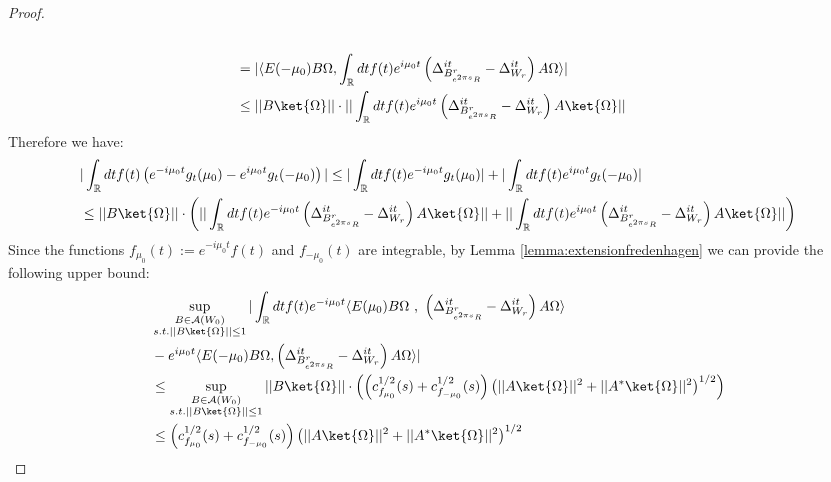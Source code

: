 \documentclass[a4paper,11pt]{article}
\theoremstyle{definition}
\theoremstyle{remark}
\newcommand{\lb}{\left(}
\newcommand{\rb}{\right)}
\begin{document}
\begin{proof}
\begin{align}
\begin{split}
            \\&
            = |\langle E(-\mu_0)B\Omega, \int_\mathbb{R} dt f(t) e^{i\mu_0 t}\lb\Delta^{it}_{B^r_{e^{2\pi s}R}} - \Delta^{it}_{W_r}\rb A \Omega \rangle|
            \\&
            \leq ||B\ket{\Omega}||\cdot||\int_\mathbb{R} dt f(t) e^{i\mu_0 t}\lb \Delta^{it}_{B^r_{e^{2\pi s}R}} - \Delta^{it}_{W_r} \rb A\ket{\Omega}||
        \end{split}
    \end{align}
    Therefore we have:
    \begin{align}
        \begin{split}
            &|\int_\mathbb{R} dt f(t)\lb e^{-i\mu_0 t}g_t(\mu_0) - e^{i\mu_0 t}g_t(-\mu_0) \rb| \leq |\int_\mathbb{R} dt f(t) e^{-i\mu_0 t}g_t(\mu_0)| + |\int_\mathbb{R} dt f(t) e^{i\mu_0 t}g_t(-\mu_0)|
            \\&
            \leq ||B\ket{\Omega}||\cdot \lb||\int_\mathbb{R} dt f(t) e^{-i\mu_0 t}\lb\Delta^{it}_{B^r_{e^{2\pi s}R}} - \Delta^{it}_{W_r}\rb A\ket{\Omega}|| + ||\int_\mathbb{R} dt f(t) e^{i\mu_0 t}\lb\Delta^{it}_{B^r_{e^{2\pi s}R}} - \Delta^{it}_{W_r}\rb A\ket{\Omega}||\rb
        \end{split}
    \end{align}
    Since the functions $f_{\mu_0}(t) := e^{-i\mu_0 t}f(t)$ and $f_{-\mu_0}(t)$ are integrable, by Lemma \ref{lemma:extensionfredenhagen} we can provide the following upper bound:
    \begin{align}
        \begin{split}
            &\sup_{\substack{B\in\mathcal{A}(W_0)\\s.t.||B\ket{\Omega}||\leq 1}}|\int_\mathbb{R} dt f(t) e^{-i\mu_0 t}\langle E(\mu_0)B\Omega\text{ , }\lb\Delta^{it}_{B^r_{e^{2\pi s}R}} - \Delta^{it}_{W_r}\rb A\Omega\rangle \\& - e^{i\mu_0 t}\langle E(-\mu_0)B\Omega, \lb\Delta^{it}_{B^r_{e^{2\pi s}R}} - \Delta^{it}_{W_r}\rb A\Omega\rangle|
            \\&
            \leq \sup_{\substack{B\in\mathcal{A}(W_0)\\s.t.||B\ket{\Omega}||\leq 1}}||B\ket{\Omega}||\cdot\lb \lb c_{f_{\mu_0}}^{1/2}(s) + c_{f_{-\mu_0}}^{1/2}(s)\rb\lb||A\ket{\Omega}||^2 + ||A^*\ket{\Omega}||^2\rb^{1/2}\rb
            \\&
            \leq \lb c_{f_{\mu_0}}^{1/2}(s) + c_{f_{-\mu_0}}^{1/2}(s)\rb\lb||A\ket{\Omega}||^2 + ||A^*\ket{\Omega}||^2\rb^{1/2}
        \end{split}

\end{align}
\end{proof}
\end{document}
